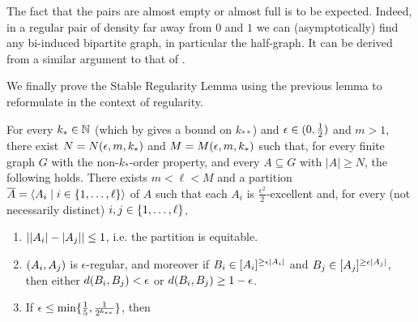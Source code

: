         \begin{remark}
            The fact that the pairs are almost empty or almost full is to be expected.
            Indeed, in a regular pair of density far away from $0$ and $1$ we can (asymptotically) find any bi-induced
            bipartite graph, in particular the half-graph.
            It can be derived from a similar argument to that of .
        \end{remark}

        We finally prove the Stable Regularity Lemma using the previous lemma to reformulate
         in the context of regularity.

        \begin{theorem} \label{thm:existance_of_regular_partitions}
            For every $k_* \in \mathbb{N}$ (which by  gives a bound on $k_{**}$) and
            $\epsilon \in ( 0, \frac{1}{2} )$ and $m > 1$, there exist $N = N( \epsilon, m, k_* )$
            and $M = M( \epsilon, m, k_* )$ such that, for every finite graph $G$ with the non-$k_{*}$-order property,
            and every $A \subseteq G$ with $|A| \geq N$, the following holds.
            There exists $m < \ell < M$ and a partition
            $\overline{A} = \left< A_i \mid i \in \{ 1, \dots, \ell \} \right>$ of $A$ such that each $A_i$ is
            $\frac{\epsilon^2}{2}$-excellent and, for every (not necessarily distinct) $i, j \in \{ 1, \dots, \ell \}$,
            \begin{enumerate}[label={\Roman*}., ref={\Roman*}, font=\rmfamily]
                \item \label{itm:existance_of_regular_partitions.1} $| | A_i |- | A_j | | \leq 1$,
                    i.e. the partition is equitable.
                \item \label{itm:existance_of_regular_partitions.2} $( A_i, A_j )$ is $\epsilon$-regular, and moreover if
                    $B_i \in [ A_i ]^{\geq \epsilon | A_i |}$ and $B_j \in [ A_j ]^{\geq \epsilon | A_j |}$,
                    then either $d( B_i, B_j ) < \epsilon$ or $d( B_i, B_j ) \geq 1 - \epsilon$.
                \item \label{itm:existance_of_regular_partitions.3} If $\epsilon \leq \min \{ \frac{1}{5}, \frac{1}{2^{k_{**}}} \}$, then

\end{enumerate}
\end{theorem}
